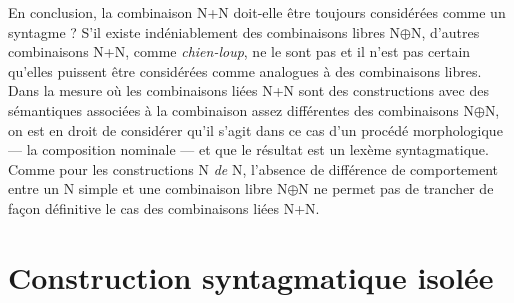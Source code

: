 {    En conclusion, la combinaison N+N doit-elle être toujours considérées comme un syntagme ? S’il existe indéniablement des combinaisons libres N\textrm{${\oplus}$}N, d’autres combinaisons N+N, comme \textit{chien-loup}, ne le sont pas et il n’est pas certain qu’elles puissent être considérées comme analogues à des combinaisons libres. Dans la mesure où les combinaisons liées N+N sont des constructions avec des sémantiques associées à la combinaison assez différentes des combinaisons N\textrm{${\oplus}$}N, on est en droit de considérer qu’il s’agit dans ce cas d’un procédé morphologique — la composition nominale — et que le résultat est un lexème syntagmatique. Comme pour les constructions N \textit{de} N, l’absence de différence de comportement entre un N simple et une combinaison libre N\textrm{${\oplus}$}N ne permet pas de trancher de façon définitive le cas des combinaisons liées N+N.
}
\section{Construction syntagmatique isolée}\label{sec:3.1.14}

